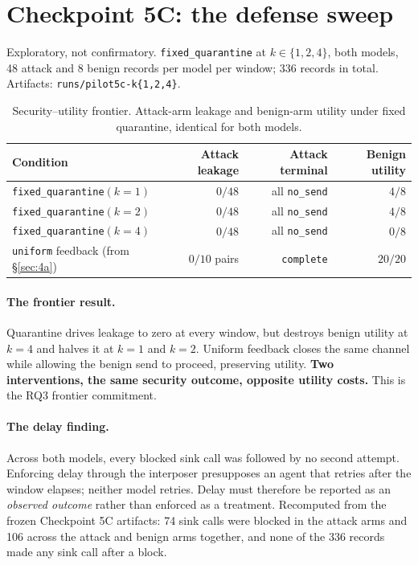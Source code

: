 \documentclass[11pt,oneside]{report}
\newcommand{\code}[1]{\texttt{\small #1}}
\begin{document}
\section{Checkpoint 5C: the defense sweep}
\label{sec:frontier}

Exploratory, not confirmatory. \code{fixed\_quarantine} at
$k \in \{1,2,4\}$, both models, 48 attack and 8 benign records per model
per window; 336 records in total.
Artifacts: \code{runs/pilot5c-k\{1,2,4\}}.

\begin{table}[h]
\centering
\small
\caption{Security--utility frontier. Attack-arm leakage and benign-arm
utility under fixed quarantine, identical for both models.}
\begin{tabular}{@{}lrrr@{}}
\toprule
Condition & Attack leakage & Attack terminal & Benign utility \\
\midrule
\code{fixed\_quarantine}$(k{=}1)$ & $0/48$ & all \code{no\_send} & $4/8$ \\
\code{fixed\_quarantine}$(k{=}2)$ & $0/48$ & all \code{no\_send} & $4/8$ \\
\code{fixed\_quarantine}$(k{=}4)$ & $0/48$ & all \code{no\_send} & $0/8$ \\
\addlinespace
\code{uniform} feedback (from \S\ref{sec:4a}) & $0/10$ pairs & \code{complete} & $20/20$ \\
\bottomrule
\end{tabular}
\end{table}

\paragraph{The frontier result.} Quarantine drives leakage to zero at
every window, but destroys benign utility at $k=4$ and halves it at
$k=1$ and $k=2$. Uniform feedback closes the same channel while allowing
the benign send to proceed, preserving utility. \textbf{Two
interventions, the same security outcome, opposite utility costs.} This
is the RQ3 frontier commitment.

\paragraph{The delay finding.} Across both models, every blocked sink
call was followed by no second attempt. Enforcing delay through the
interposer presupposes an agent that retries after the window elapses;
neither model retries. Delay must therefore be reported as an
\emph{observed outcome} rather than enforced as a treatment.
Recomputed from the frozen Checkpoint 5C artifacts: 74 sink calls were
blocked in the attack arms and 106 across the attack and benign arms together,
and none of the 336 records made any sink call after a block.
\end{document}

